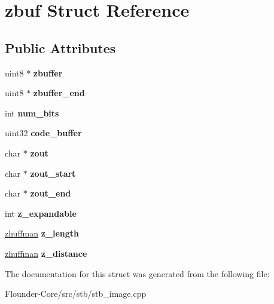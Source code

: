 \hypertarget{structzbuf}{}\section{zbuf Struct Reference}
\label{structzbuf}
\subsection*{Public Attributes}
\begin{DoxyCompactItemize}
\item 
\mbox{\label{structzbuf_a7080eb91dcc67e1dfe818d08e6f22c4e}} 
uint8 $\ast$ {\bfseries zbuffer}
\item 
\mbox{\label{structzbuf_af030baa17bebedd18272678da17a33f4}} 
uint8 $\ast$ {\bfseries zbuffer\+\_\+end}
\item 
\mbox{\label{structzbuf_acd069cdb4100884a732ad2794edbbdff}} 
int {\bfseries num\+\_\+bits}
\item 
\mbox{\label{structzbuf_a3bb8244d7be17801079c5a8587182edb}} 
uint32 {\bfseries code\+\_\+buffer}
\item 
\mbox{\label{structzbuf_aaf137c25fa5b9fb14e92354da4203c38}} 
char $\ast$ {\bfseries zout}
\item 
\mbox{\label{structzbuf_af31571e8d74c78c9bb18d92205150b28}} 
char $\ast$ {\bfseries zout\+\_\+start}
\item 
\mbox{\label{structzbuf_af07c0b7b7227f670ee1413bc0dcab791}} 
char $\ast$ {\bfseries zout\+\_\+end}
\item 
\mbox{\label{structzbuf_ae662f24e0973ca19b543e64647a6bfb6}} 
int {\bfseries z\+\_\+expandable}
\item 
\mbox{\label{structzbuf_a5906bdbe9dfb565339acac51af9efe89}} 
\hyperlink{structzhuffman}{zhuffman} {\bfseries z\+\_\+length}
\item 
\mbox{\label{structzbuf_ae7d9588b2548708e14f3c6ad89bf26b5}} 
\hyperlink{structzhuffman}{zhuffman} {\bfseries z\+\_\+distance}
\end{DoxyCompactItemize}


The documentation for this struct was generated from the following file\+:\begin{DoxyCompactItemize}
\item 
Flounder-\/\+Core/src/stb/stb\+\_\+image.\+cpp\end{DoxyCompactItemize}
